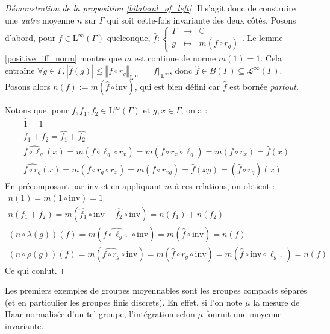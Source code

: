 \documentclass[a4paper,12pt]{article}
\newcommand{\C}{\mathbb{C}}
\newcommand{\norm}[1]{\left\Vert #1\right\Vert}
\newcommand{\abs}[1]{\left\vert#1\right\vert}
\newcommand\fundef[3]{#1: \left\{\begin{array}{ccc}#2\\#3\end{array}\right.}
\newcommand{\inv}{^{-1}}
\newcommand{\comp}{\circ}
\newcommand{\invop}{\mathrm{inv}}
\begin{document}
\begin{proof}[Démonstration de la proposition \ref{bilateral_of_left}]
    Il s'agit donc de construire une \emph{autre} moyenne $n$ sur $\Gamma$ qui soit cette-fois invariante des deux côtés.
    Posons d'abord, pour $f\in\mathrm{L}^\infty(\Gamma)$ quelconque, $\fundef{\widehat{f}}{\Gamma&\to&\C}{g&\mapsto&m(f\comp r_g)}$. Le lemme \ref{positive_iff_norm}
    montre que $m$ est continue de norme $m(1) = 1$. Cela entraîne
    $\forall g\in\Gamma, \abs{\widehat{f}(g)} \le \norm{f\comp r_g}_{\mathrm{L}^\infty} = \norm{f}_{\mathrm{L}^\infty}$, 
    donc $\widehat{f}\in B(\Gamma)\subseteq\mathscr{L}^\infty(\Gamma)$.
    Posons alors $n(f) := m\left(\widehat{f}\comp\invop\right)$, qui est bien défini car $\widehat{f}$ est bornée \emph{partout}.

    Notons que, pour $f, f_1, f_2\in\mathrm{L}^\infty(\Gamma)$ et $g, x\in\Gamma$, on a :
    \begin{gather*}
        \widehat{1} = 1 \\
        \widehat{f_1 + f_2} = \widehat{f_1} + \widehat{f_2} \\
        \widehat{f\comp\ell_g}(x) = m(f\comp\ell_g\comp r_x) = m(f\comp r_x\comp\ell_g) = m(f\comp r_x) = \widehat{f}(x) \\
        \widehat{f\comp r_g}(x) = m(f\comp r_g\comp r_x) = m(f\comp r_{xg}) = \widehat{f}(xg) = \left(\widehat{f}\comp r_g\right)(x)
    \end{gather*}
    En précomposant par $\invop$ et en appliquant $m$ à ces relations, on obtient :
    \begin{gather*}
        n(1) = m(1\comp\invop) = 1 \\
        n(f_1 + f_2) = m\left(\widehat{f_1}\comp\invop + \widehat{f_2}\comp\invop\right) = n(f_1) + n(f_2) \\
        (n\comp\lambda(g))(f) = m\left(\widehat{f\comp\ell_{g\inv}}\comp\invop\right) = m\left(\widehat{f}\comp\invop\right) = n(f) \\
        (n\comp\rho(g))(f) = m\left(\widehat{f\comp r_g}\comp\invop\right) = m\left(\widehat{f}\comp r_g\comp\invop\right) = m\left(\widehat{f}\comp \invop\comp\ell_{g\inv}\right) = n(f)
    \end{gather*}
    Ce qui conlut.
\end{proof}

Les premiers exemples de groupes moyennables sont les groupes compacts séparés (et en particulier les groupes finis discrets).
En effet, si l'on note $\mu$ la mesure de Haar normalisée d'un tel groupe, l'intégration selon $\mu$ fournit une moyenne invariante. 
\end{document}
